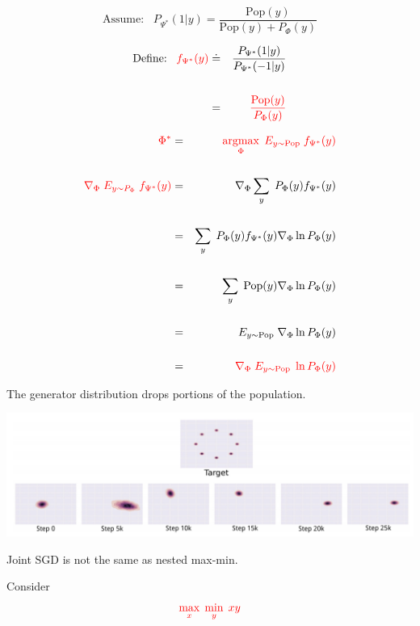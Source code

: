 {{\vfill
$$\mbox{Assume:}\;\;\; P_{\Psi^*}(1|y) = \frac{\mathrm{Pop}(y)}{\mathrm{Pop}(y) + P_\Phi(y)}$$

\vfill
\begin{eqnarray*}
  \mbox{Define:}\;\;\; {\color{red} f_{\Psi^*}(y)} & \doteq & \frac{P_{\Psi^*}(1|y)}{P_{\Psi^*}(-1|y)} \\
\\
& = & {\color{red} \frac{\mathrm{Pop}(y)}{P_\Phi(y)}}
\end{eqnarray*}


{\huge
\begin{eqnarray*}
 {\color{red} \Phi^*}& = & {\color{red} \operatorname*{argmax}_\Phi\;E_{y \sim \mathrm{Pop}} \;f_{\Psi^*}(y)} \\
 \\
 {\color{red} \nabla_\Phi \; E_{y \sim P_\Phi}\;  f_{\Psi^*}(y)}  & = & \nabla _\Phi \sum_y\; P_\Phi(y) f_{\Psi^*}(y) \\
  \\
  & = & \sum_y \; P_\Phi(y) f_{\Psi^*}(y) \nabla_\Phi \ln P_\Phi(y) \\
  \\
  & = & \sum_y \;\mathrm{Pop}(y) \nabla_\Phi \ln P_\Phi(y) \\
  \\
  & = & E_{y \sim \mathrm{Pop}} \; \nabla_\Phi \ln P_\Phi(y) \\
  \\
  & = & {\color{red} \nabla_\Phi \; E_{y \sim \mathrm{Pop}} \;\ln P_\Phi(y)}
\end{eqnarray*}
}
}



The generator distribution drops portions of the population.

\centerline{\includegraphics[width=9in]{../images/Unstable1}}


Joint SGD is not the same as nested max-min.

\vfill
Consider
$${\color{red} \max_x \; \min_y\; xy}$$

}
